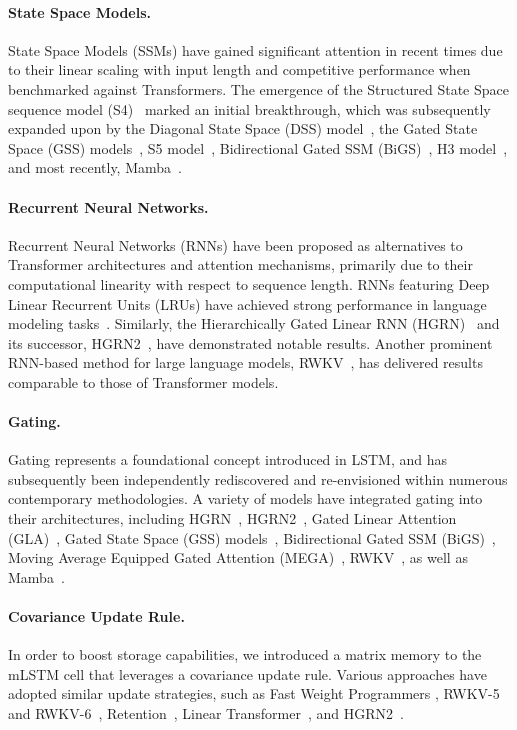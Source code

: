 \paragraph{State Space Models.} State Space Models (SSMs) have gained significant attention in recent times due to their linear scaling with input length and competitive performance when benchmarked against Transformers. The emergence of the Structured State Space sequence model (S4)~\citep{Gu:21} marked an initial breakthrough, which was subsequently expanded upon by the Diagonal State Space (DSS) model~\citep{Gupta:22}, the Gated State Space (GSS) models~\citep{Mehta:22}, S5 model~\citep{Smith:22}, Bidirectional Gated SSM (BiGS)~\citep{Wang:22}, H3 model~\citep{Fu:23}, and most recently, Mamba~\citep{Gu:24arxiv}.

\paragraph{Recurrent Neural Networks.} Recurrent Neural Networks (RNNs) have been proposed as alternatives to Transformer architectures and attention mechanisms, primarily due to their computational linearity with respect to sequence length. RNNs featuring Deep Linear Recurrent Units (LRUs) have achieved strong performance in language modeling tasks~\citep{Orvieto:23, De:24arxiv}. Similarly, the Hierarchically Gated Linear RNN (HGRN)~\citep{Qin:23} and its successor, HGRN2~\citep{Qin:24arxiv}, have demonstrated notable results. Another prominent RNN-based method for large language models, RWKV~\citep{Peng:23arxivshort,Peng:24arxivshort}, has delivered results comparable to those of Transformer models.

\paragraph{Gating.}
Gating represents a foundational concept introduced in LSTM, and has subsequently been independently rediscovered and re-envisioned within numerous contemporary methodologies. A variety of models have integrated gating into their architectures, including HGRN~\citep{Qin:23}, HGRN2~\citep{Qin:24arxiv}, Gated Linear Attention (GLA)~\citep{Yang:23arxiv}, Gated State Space (GSS) models~\citep{Mehta:22}, Bidirectional Gated SSM (BiGS)~\citep{Wang:22}, Moving Average Equipped Gated Attention (MEGA)~\citep{Ma:22}, RWKV~\citep{Peng:23arxivshort}, as well as Mamba~\citep{Gu:24arxiv}.

\paragraph{Covariance Update Rule.} In order to boost storage capabilities, we introduced a matrix memory to the mLSTM cell that leverages a covariance update rule. Various approaches have adopted similar update strategies, such as Fast Weight Programmers \citep{Schmidhuber:92ncfastweights,Schlag:21}, RWKV-5 and RWKV-6~\citep{Peng:24arxivshort}, Retention~\citep{Sun:23arxiv}, Linear Transformer~\citep{Katharopoulos:20}, and HGRN2~\citep{Qin:24arxiv}.

